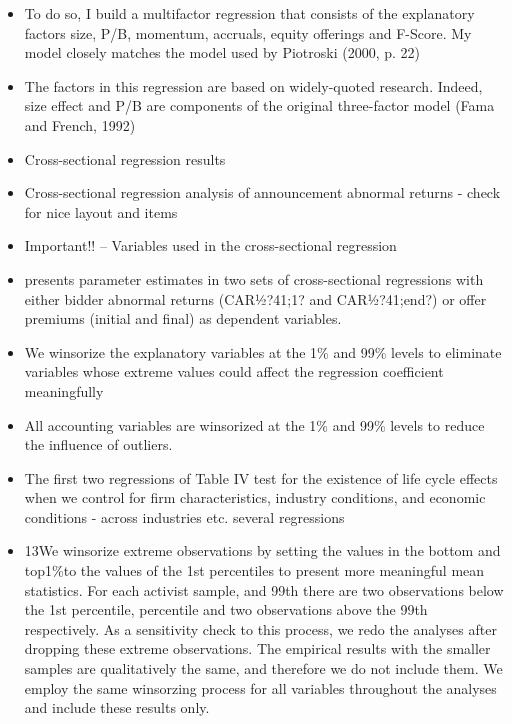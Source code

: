 \documentclass[12pt]{article}
\begin{document}
    \begin{itemize}
        \item To do so, I build a multifactor regression that consists of the explanatory factors size, P/B, momentum, accruals, equity offerings and F-Score. My model closely matches the model used by Piotroski (2000, p. 22) \citep{Mohr2012}

        \item The factors in this regression are based on widely-quoted research. Indeed, size effect and P/B are components of the original three-factor model (Fama and French, 1992) \citep{Mohr2012}

        \item Cross-sectional regression results \citep[p.3094]{Akhigbe2007}

        \item Cross-sectional regression analysis of announcement abnormal returns \citep{Moeller2004} - check for nice layout and items

        \item Important!! -- Variables used in the cross-sectional regression  \citep{Betton2009}

        \item presents parameter estimates in two sets of cross-sectional regressions with either bidder abnormal returns (CAR½?41;1? and CAR½?41;end?) or offer premiums (initial and final) as dependent variables. \citep{Betton2009}

        \item We winsorize the explanatory variables at the 1\% and 99\% levels to eliminate variables whose extreme values could affect the regression coefficient meaningfully \citep{Arikan2016}
        \item 
        All accounting variables are winsorized at the 1\% and 99\% levels to reduce the influence of outliers. \citep{Greenwood2009}
        \item The first two regressions of Table IV test for the existence of life cycle effects when we control for firm characteristics, industry conditions, and economic conditions \citep{Arikan2016} - across industries etc. several regressions

        \item 13We winsorize extreme observations by setting the values in the bottom and top1\%to the values of the 1st percentiles to present more meaningful mean statistics. For each activist sample, and 99th there are two observations below the 1st percentile, percentile and two observations above the 99th respectively. As a sensitivity check to this process, we redo the analyses after dropping these extreme observations. The empirical results with the smaller samples are qualitatively the same, and therefore we do not include them. We employ the same winsorzing process for all variables
        throughout the analyses and include these results only.


\end{itemize}
\end{document}

